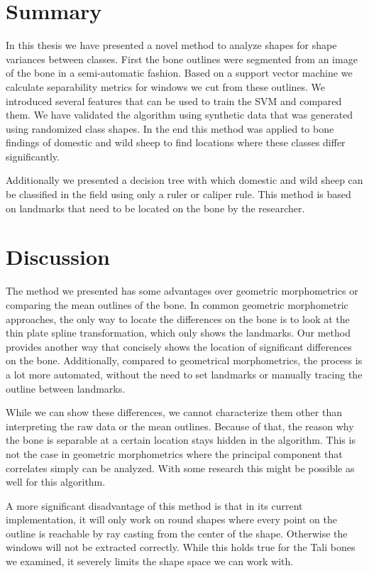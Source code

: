 \documentclass[pdftex,12pt,a4paper]{report}
\begin{document}
\section{Summary}

In this thesis we have presented a novel method to analyze shapes for shape variances between classes. First the bone outlines were segmented from an image of the bone in a semi-automatic fashion. Based on a support vector machine we calculate separability metrics for windows we cut from these outlines. We introduced several features that can be used to train the SVM and compared them. We have validated the algorithm using synthetic data that was generated using randomized class shapes. In the end this method was applied to bone findings of domestic and wild sheep to find locations where these classes differ significantly.

Additionally we presented a decision tree with which domestic and wild sheep can be classified in the field using only a ruler or caliper rule. This method is based on landmarks that need to be located on the bone by the researcher.

\section{Discussion}

The method we presented has some advantages over geometric morphometrics or comparing the mean outlines of the bone. In common geometric morphometric approaches, the only way to locate the differences on the bone is to look at the thin plate spline transformation, which only shows the landmarks. Our method provides another way that concisely shows the location of significant differences on the bone. Additionally, compared to geometrical morphometrics, the process is a lot more automated, without the need to set landmarks or manually tracing the outline between landmarks.

While we can show these differences, we cannot characterize them other than interpreting the raw data or the mean outlines. Because of that, the reason why the bone is separable at a certain location stays hidden in the algorithm. This is not the case in geometric morphometrics where the principal component that correlates simply can be analyzed. With some research this might be possible as well for this algorithm.

A more significant disadvantage of this method is that in its current implementation, it will only work on round shapes where every point on the outline is reachable by ray casting from the center of the shape. Otherwise the windows will not be extracted correctly. While this holds true for the Tali bones we examined, it severely limits the shape space we can work with.
\end{document}
